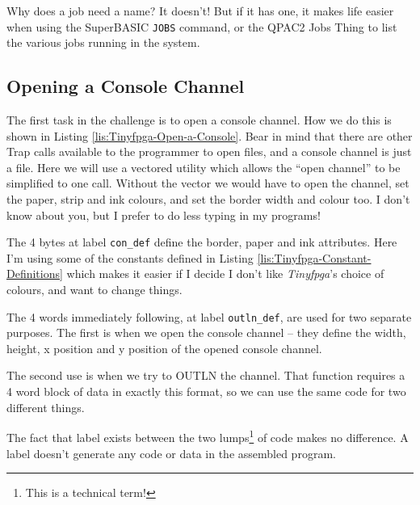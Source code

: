 Why does a job need a name? It doesn't! But if it has one, it makes
life easier when using the SuperBASIC \texttt{JOBS} command, or the
QPAC2 Jobs Thing to list the various jobs running in the system.

\subsection{Opening a Console Channel}

The first task in the challenge is to open a console channel. How
we do this is shown in Listing \ref{lis:Tinyfpga-Open-a-Console}.
Bear in mind that there are other Trap calls available to the programmer
to open files, and a console channel is just a file. Here we will
use a vectored utility which allows the ``open channel'' to be simplified
to one call. Without the vector we would have to open the channel,
set the paper, strip and ink colours, and set the border width and
colour too. I don't know about you, but I prefer to do less typing
in my programs!

The 4 bytes at label \texttt{con\_def} define the border, paper and
ink attributes. Here I'm using some of the constants defined in Listing
\ref{lis:Tinyfpga-Constant-Definitions} which makes it easier if
I decide I don't like \emph{Tinyfpga}'s choice of colours, and want
to change things. 

The 4 words immediately following, at label \texttt{outln\_def}, are
used for two separate purposes. The first is when we open the console
channel -- they define the width, height, x position and y position
of the opened console channel.

The second use is when we try to OUTLN the channel. That function
requires a 4 word block of data in exactly this format, so we can
use the same code for two different things.

The fact that label exists between the two lumps\footnote{This is a technical term!}
of code makes no difference. A label doesn't generate any code or
data in the assembled program.

